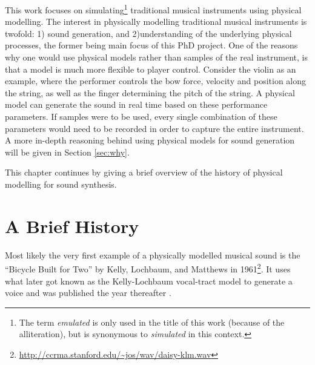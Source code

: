 This work focuses on simulating\footnote{The term \textit{emulated} is only used in the title of this work (because of the alliteration), but is synonymous to \textit{simulated} in this context.} traditional musical instruments using physical modelling. 
The interest in physically modelling traditional musical instruments is twofold: 1) sound generation, and 2)understanding of the underlying physical processes, the former being main focus of this PhD project. One of the reasons why one would use physical models rather than samples of the real instrument, is that a model is much more flexible to player control. Consider the violin as an example, where the performer controls the bow force, velocity and position along the string, as well as the finger determining the pitch of the string. A physical model can generate the sound in real time based on these performance parameters. If samples were to be used, every single combination of these parameters would need to be recorded in order to capture the entire instrument.
A more in-depth reasoning behind using physical models for sound generation will be given in Section \ref{sec:why}.

This chapter continues by giving a brief overview of the history of physical modelling for sound synthesis.

\section{A Brief History}\label{sec:history}


Most likely the very first example of a physically modelled musical sound is the ``Bicycle Built for Two'' by Kelly, Lochbaum, and Matthews in 1961\footnote{\url{http://ccrma.stanford.edu/~jos/wav/daisy-klm.wav}}. It uses what later got known as the Kelly-Lochbaum vocal-tract model to generate a voice and was published the year thereafter \cite{Kelly1962}. 

